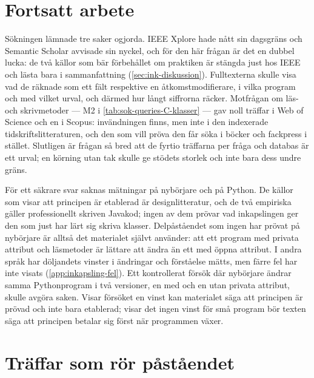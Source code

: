 \section{Fortsatt arbete}
\label{sec:ink-fortsatt}

Sökningen lämnade tre saker ogjorda.  IEEE Xplore hade nått sin
dagsgräns och Semantic Scholar avvisade sin nyckel, och för den här
frågan är det en dubbel lucka: de två källor som bär förbehållet om
praktiken\autocite{Tempero2009Fields,ZollerSchmolitzky2012} är stängda
just hos IEEE och lästa bara i sammanfattning
(\cref{sec:ink-diskussion}).  Fulltexterna skulle visa vad de räknade
som ett fält respektive en åtkomstmodifierare, i vilka program och med
vilket urval, och därmed hur långt siffrorna räcker.  Motfrågan om
läs- och skrivmetoder --- M2 i \cref{tab:sok-queries-C-klasser} --- gav noll
träffar i Web of Science och en i Scopus: invändningen finns, men inte i
den indexerade tidskriftslitteraturen, och den som vill pröva den får
söka i böcker och fackpress i stället.  Slutligen är frågan så bred att
de fyrtio träffarna per fråga och databas är ett urval; en körning utan
tak skulle ge stödets storlek och inte bara dess undre gräns.

För ett säkrare svar saknas mätningar på nybörjare och på Python.  De
källor som visar att principen är etablerad är designlitteratur, och de
två empiriska gäller professionellt skriven Javakod; ingen av dem prövar
vad inkapslingen ger den som just har lärt sig skriva klasser.
Delpåståendet som ingen har prövat på nybörjare är alltså det materialet
självt använder: att ett program med privata attribut och läsmetoder är
lättare att ändra än ett med öppna attribut.  I andra språk har
döljandets vinster i ändringar och förståelse mätts, men färre fel har
inte visats (\cref{app:inkapsling-fel}).  Ett kontrollerat försök
där nybörjare ändrar samma Pythonprogram i två versioner, en med och en
utan privata attribut, skulle avgöra saken.  Visar försöket en vinst kan
materialet säga att principen är prövad och inte bara etablerad; visar
det ingen vinst för små program bör texten säga att principen betalar
sig först när programmen växer.

\section{Träffar som rör påståendet}
\label{sec:ink-traffar}

